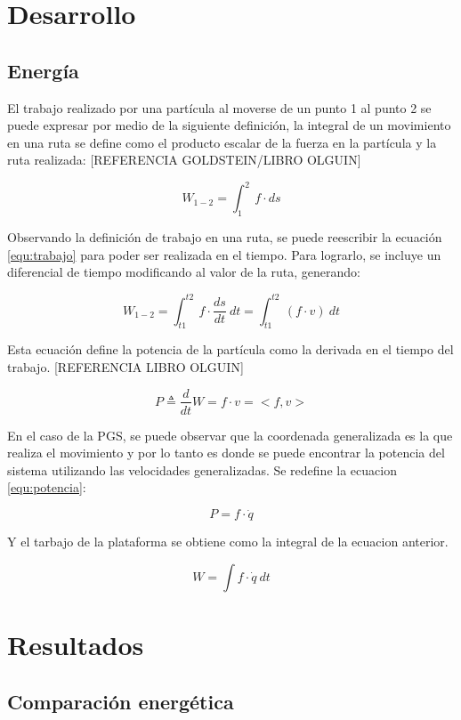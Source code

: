 \documentclass[letterpaper, 12pt]{article}
\begin{document}
\section{Desarrollo}
\subsection{Energía}
El trabajo realizado por una partícula al moverse de un punto 1 al punto 2 se puede expresar por medio de la siguiente definición, la integral de un movimiento en una ruta se define como el producto escalar de la fuerza en la partícula y la ruta realizada: [REFERENCIA GOLDSTEIN/LIBRO OLGUIN]

\begin{equation}\label{equ:trabajo}
W_{1-2} = \int_1^2 \ f \cdot ds
\end{equation}

Observando la definición de trabajo en una ruta, se puede reescribir la ecuación \ref{equ:trabajo} para poder ser realizada en el tiempo. Para lograrlo, se incluye un diferencial de tiempo modificando al valor de la ruta, generando:

\begin{equation}\label{equ:trabajo}
W_{1-2} = \int_{t1}^{t2} \ f \cdot \frac{ds}{dt} \ dt = \int_{t1}^{t2} \ (f \cdot v) \ dt
\end{equation}

Esta ecuación define la potencia de la partícula como la derivada en el tiempo del trabajo.
[REFERENCIA LIBRO OLGUIN]

\begin{equation} \label{equ:potencia}
P \triangleq \frac{d}{dt}W = f \cdot v = <f,v>
\end{equation}

En el caso de la PGS, se puede observar que la coordenada generalizada es la que realiza el movimiento y por lo tanto es donde se puede encontrar la potencia del sistema utilizando las velocidades generalizadas. Se redefine la ecuacion \ref{equ:potencia}:

\begin{equation}
P = f \cdot \dot{q}
\end{equation}

Y el tarbajo de la plataforma se obtiene como la integral de la ecuacion anterior.

\begin{equation}\label{equ:trabajo-plat}
W = \int f \cdot \dot{q}\ dt
\end{equation}

\section{Resultados}
\subsection{Comparación energética}
\end{document}
